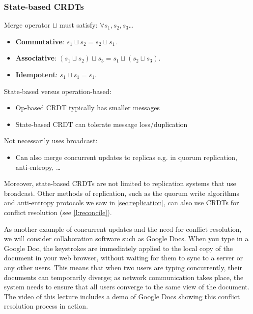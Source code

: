 \begin{frame}
    \label{s:state-crdt}
    \frametitle{State-based CRDTs}
    Merge operator $\sqcup$ must satisfy: $\forall s_1, s_2, s_3$\dots
    \begin{itemize}
        \item \textbf{Commutative}: $s_1 \sqcup s_2 = s_2 \sqcup s_1.$
        \item \textbf{Associative}: $(s_1 \sqcup s_2) \sqcup s_3 = s_1 \sqcup (s_2 \sqcup s_3).$
        \item \textbf{Idempotent}: $s_1 \sqcup s_1 = s_1.$\\[1em]\pause
    \end{itemize}
    State-based versus operation-based:
    \begin{itemize}
        \item Op-based CRDT typically has smaller messages
        \item State-based CRDT can tolerate message loss/duplication\\[1em]\pause
    \end{itemize}
    Not necessarily uses broadcast:
    \begin{itemize}
        \item Can also merge concurrent updates to replicas e.g. in quorum replication, anti-entropy, \dots
    \end{itemize}
\end{frame}
\label{l:state-crdt}

Moreover, state-based CRDTs are not limited to replication systems that use broadcast.
Other methods of replication, such as the quorum write algorithms and anti-entropy protocols we saw in \autoref{sec:replication}, can also use CRDTs for conflict resolution (see \autoref{l:reconcile}).

As another example of concurrent updates and the need for conflict resolution, we will consider collaboration software such as Google Docs.
When you type in a Google Doc, the keystrokes are immediately applied to the local copy of the document in your web browser, without waiting for them to sync to a server or any other users.
This means that when two users are typing concurrently, their documents can temporarily diverge; as network communication takes place, the system needs to ensure that all users converge to the same view of the document.
The video of this lecture includes a demo of Google Docs showing this conflict resolution process in action.

